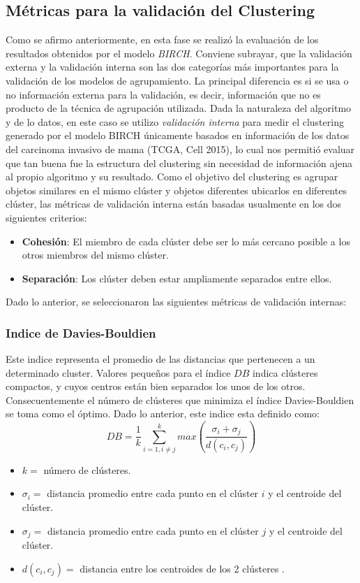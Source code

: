 \subsection{Métricas para la validación del Clustering}
Como se afirmo anteriormente, en esta fase se realizó la evaluación de los resultados obtenidos por el modelo \textit{BIRCH}. Conviene subrayar, que la validación externa y la validación interna son las dos categorías más importantes para la validación de los modelos de agrupamiento. La principal diferencia es si se usa o no información externa para la validación, es decir, información que no es producto de la técnica de agrupación utilizada\cite{Elizabeth2023}. Dada la naturaleza del algoritmo y de lo datos, en este caso se utilizo \textit{validación interna} para medir el clustering generado por el modelo BIRCH únicamente basados en información de los datos del carcinoma invasivo de mama (TCGA, Cell 2015), lo cual nos permitió evaluar que tan buena fue la estructura del clustering sin necesidad de información ajena al propio algoritmo y su resultado. Como el objetivo del clustering es agrupar objetos similares en el mismo clúster y objetos diferentes ubicarlos en diferentes clúster, las métricas de validación interna están basadas usualmente en los dos siguientes criterios\cite{Elizabeth2023}:
\begin{itemize}[label=\HandRight]
	\item \textbf{Cohesión}: El miembro de cada clúster debe ser lo más cercano posible a los otros miembros del mismo clúster.
	\item \textbf{Separación}: Los clúster deben estar ampliamente separados entre ellos.
\end{itemize}
Dado lo anterior, se seleccionaron las siguientes métricas de validación internas:
\subsubsection{Indice de Davies-Bouldien}
Este indice representa el promedio de las distancias que pertenecen a un determinado cluster.	Valores pequeños para el índice $DB$ indica clústeres compactos, y cuyos centros están bien separados los unos de los otros. Consecuentemente el número de clústeres que minimiza el índice Davies-Bouldien se toma como el óptimo. Dado lo anterior, este indice esta definido como:
\begin{equation}
	DB = \frac{1}{k} \sum_{i=1,i\neq j}^{k} max \left( \frac{\sigma_{i}+\sigma_{j}}{d(c_{i},c_{j})}\right) 
\end{equation}
\begin{itemize}[label=]
	\item $k=$ número de clústeres.
	\item $\sigma_{i}=$ distancia promedio entre cada punto en el clúster $i$ y el centroide del clúster.
	\item $\sigma_{j}=$ distancia promedio entre cada punto en el clúster $j$ y el centroide del clúster.
	\item $d(c_{i},c_{j})=$ distancia entre los centroides de los 2 clústeres .
\end{itemize}
